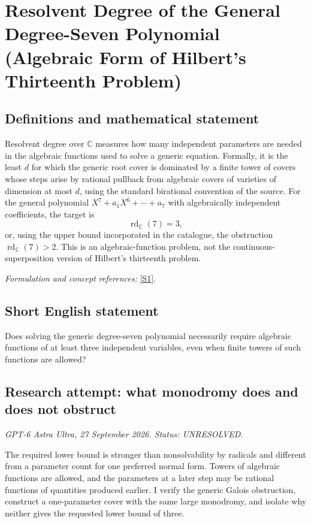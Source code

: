 \documentclass[11pt]{article}
\begin{document}
\section*{\texorpdfstring{Resolvent Degree of the General Degree-Seven Polynomial (Algebraic Form of Hilbert's Thirteenth Problem)}{Resolvent Degree of the General Degree-Seven Polynomial (Algebraic Form of Hilbert's Thirteenth Problem)}}\label{283}
\subsection{Definitions and mathematical statement}
Resolvent degree over ${\mathbb{C}}$ measures how many independent parameters are needed in the algebraic functions used to solve a generic equation. Formally, it is the least $d$ for which the generic root cover is dominated by a finite tower of covers whose steps arise by rational pullback from algebraic covers of varieties of dimension at most $d$, using the standard birational convention of the source. For the general polynomial
$X^7+a_1X^6+\cdots+a_7$ with algebraically independent coefficients, the target is
\[
 \operatorname{rd}_{{\mathbb{C}}}(7)=3,
\]
or, using the upper bound incorporated in the catalogue, the obstruction $\operatorname{rd}_{{\mathbb{C}}}(7)>2$. This is an algebraic-function problem, not the continuous-superposition version of Hilbert's thirteenth problem.
\par\smallskip\textit{Formulation and concept references:} \href{https://iopscience.iop.org/article/10.1070/RM2004v059n01ABEH000698}{[S1]}.

\subsection{Short English statement}
Does solving the generic degree-seven polynomial necessarily require algebraic functions of at least three independent variables, even when finite towers of such functions are allowed?
\subsection{Research attempt: what monodromy does and does not obstruct}
\textit{GPT-6 Astra Ultra, 27 September 2026. Status: UNRESOLVED.}

The required lower bound is stronger than nonsolvability by radicals and different from a parameter count for one preferred normal form. Towers of algebraic functions are allowed, and the parameters at a later step may be rational functions of quantities produced earlier. I verify the generic Galois obstruction, construct a one-parameter cover with the same large monodromy, and isolate why neither gives the requested lower bound of three.
\end{document}
